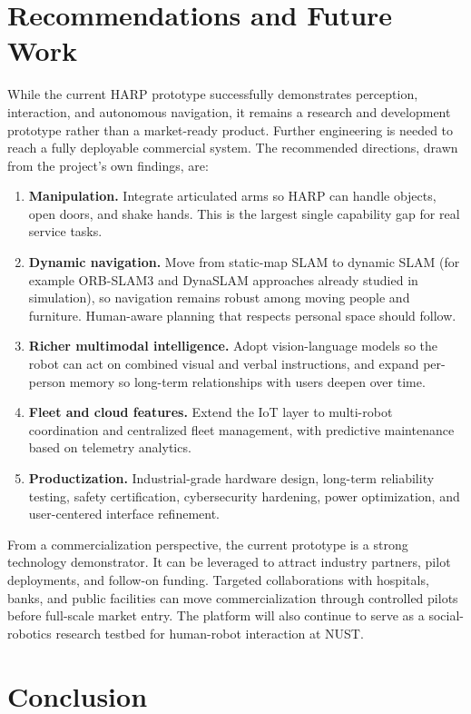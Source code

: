 \documentclass[11pt,a4paper]{article}
\begin{document}
\section{Recommendations and Future Work}

While the current HARP prototype successfully demonstrates perception, interaction, and autonomous navigation, it remains a research and development prototype rather than a market-ready product. Further engineering is needed to reach a fully deployable commercial system. The recommended directions, drawn from the project's own findings, are:

\begin{enumerate}
\item \textbf{Manipulation.} Integrate articulated arms so HARP can handle objects, open doors, and shake hands. This is the largest single capability gap for real service tasks.
\item \textbf{Dynamic navigation.} Move from static-map SLAM to dynamic SLAM (for example ORB-SLAM3 and DynaSLAM approaches already studied in simulation), so navigation remains robust among moving people and furniture. Human-aware planning that respects personal space should follow.
\item \textbf{Richer multimodal intelligence.} Adopt vision-language models so the robot can act on combined visual and verbal instructions, and expand per-person memory so long-term relationships with users deepen over time.
\item \textbf{Fleet and cloud features.} Extend the IoT layer to multi-robot coordination and centralized fleet management, with predictive maintenance based on telemetry analytics.
\item \textbf{Productization.} Industrial-grade hardware design, long-term reliability testing, safety certification, cybersecurity hardening, power optimization, and user-centered interface refinement.
\end{enumerate}

From a commercialization perspective, the current prototype is a strong technology demonstrator. It can be leveraged to attract industry partners, pilot deployments, and follow-on funding. Targeted collaborations with hospitals, banks, and public facilities can move commercialization through controlled pilots before full-scale market entry. The platform will also continue to serve as a social-robotics research testbed for human-robot interaction at NUST.

\section{Conclusion}
\end{document}
